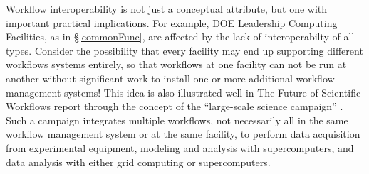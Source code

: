 Workflow interoperability is not just a conceptual attribute, but one with
important practical implications. For example, DOE Leadership Computing
Facilities, as in \S\ref{commonFunc}, are affected by the lack of
interoperabilty of all types. Consider the possibility that every facility
may end up supporting different workflows systems entirely, so that workflows
at one facility can not be run at another without significant work to install
one or more additional workflow management systems! This idea is also
illustrated well in The Future of Scientific Workflows report through the
concept of the ``large-scale science campaign'' \cite{deelman_future_2015}.
Such a campaign integrates multiple workflows, not necessarily all in the same
workflow management system or at the same facility, to perform data
acquisition from experimental equipment, modeling and analysis with
supercomputers, and data analysis with either grid computing or
supercomputers.